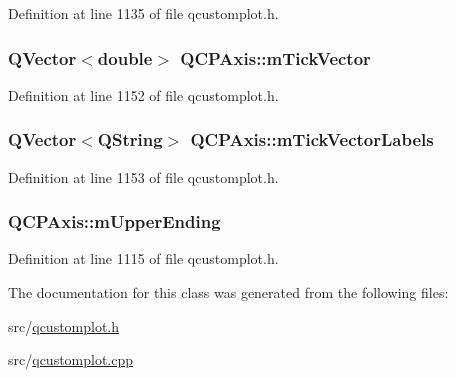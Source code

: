 Definition at line 1135 of file qcustomplot.\-h.

\hypertarget{class_q_c_p_axis_aae0f9b9973b85be601200f00f5825087}{
\subsubsection[{m\-Tick\-Vector}]{\setlength{\rightskip}{0pt plus 5cm}Q\-Vector$<$double$>$ Q\-C\-P\-Axis\-::m\-Tick\-Vector\hspace{0.3cm}{\ttfamily [protected]}}}\label{class_q_c_p_axis_aae0f9b9973b85be601200f00f5825087}


Definition at line 1152 of file qcustomplot.\-h.

\hypertarget{class_q_c_p_axis_aeee4bd0fca3f587eafe33843d1cb4f82}{
\subsubsection[{m\-Tick\-Vector\-Labels}]{\setlength{\rightskip}{0pt plus 5cm}Q\-Vector$<$Q\-String$>$ Q\-C\-P\-Axis\-::m\-Tick\-Vector\-Labels\hspace{0.3cm}{\ttfamily [protected]}}}\label{class_q_c_p_axis_aeee4bd0fca3f587eafe33843d1cb4f82}


Definition at line 1153 of file qcustomplot.\-h.

\hypertarget{class_q_c_p_axis_a988bf4ac17b3987a049f5aea7dff3ed4}{
\subsubsection[{m\-Upper\-Ending}]{ Q\-C\-P\-Axis\-::m\-Upper\-Ending\hspace{0.3cm}{\ttfamily [protected]}}}\label{class_q_c_p_axis_a988bf4ac17b3987a049f5aea7dff3ed4}


Definition at line 1115 of file qcustomplot.\-h.



The documentation for this class was generated from the following files\-:\begin{DoxyCompactItemize}
\item 
src/\hyperlink{qcustomplot_8h}{qcustomplot.\-h}\item 
src/\hyperlink{qcustomplot_8cpp}{qcustomplot.\-cpp}\end{DoxyCompactItemize}
